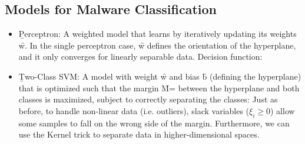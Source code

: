 \subsection{Models for Malware Classification}
\begin{itemize}
    \item \b{Perceptron}: A weighted model that learns by iteratively updating its weights \f{w}. In the single perceptron case, \f{w} defines the orientation of the hyperplane, and it only converges for linearly separable data. Decision function:
    \item \b{Two-Class SVM}: A model with weight \f{w} and bias \f{b} (defining the hyperplane) that is optimized such that the margin \f{M=} between the hyperplane and both classes is maximized, subject to correctly separating the classes:
    Just as before, to handle non-linear data (i.e. outliers), slack variables ($\xi_i \geq 0$) allow some samples to fall on the wrong side of the margin. Furthermore, we can use the Kernel trick to separate data in higher-dimensional spaces.
\end{itemize}





